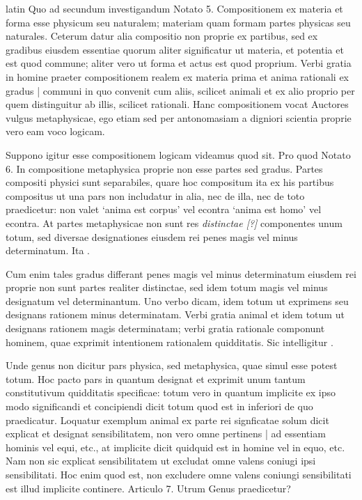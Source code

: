 \begin{otherlanguage*}{latin}
\pstart
 Quo ad secundum investigandum Notato 5. Compositionem ex materia et forma esse physicum seu naturalem; materiam quam formam partes physicas seu naturales. Ceterum datur alia compositio non proprie ex partibus, sed ex gradibus eiusdem essentiae quorum aliter significatur ut materia, et potentia et est quod commune; aliter vero ut forma et actus est quod proprium. Verbi gratia in homine praeter compositionem realem ex materia prima et anima rationali ex gradus \textnormal{|} communi in quo convenit cum aliis, scilicet animali et ex alio proprio per quem distinguitur ab illis, scilicet rationali. Hanc compositionem vocat Auctores vulgus metaphysicae, ego etiam sed per antonomasiam a digniori scientia proprie vero eam voco logicam. 
\pend

\pstart
 Suppono igitur esse compositionem logicam videamus quod sit. Pro quod Notato 6. In compositione metaphysica proprie non esse partes sed gradus. Partes compositi physici sunt separabiles, quare hoc compositum ita ex his partibus compositus ut una pars non includatur in alia, nec de illa, nec de toto praedicetur: non valet `anima est corpus' vel econtra `anima est homo' vel econtra. At partes metaphysicae non sunt  res \emph{distinctae [?]} componentes unum totum, sed diversae designationes eiusdem rei penes magis vel minus determinatum. Ita . 
\pend

\pstart
 Cum enim tales gradus differant penes magis vel minus determinatum eiusdem rei proprie non sunt partes realiter distinctae, sed idem totum magis vel minus designatum vel determinantum. Uno verbo dicam, idem totum ut exprimens seu designans rationem minus determinatam. Verbi gratia animal et idem totum ut designans rationem magis determinatam; verbi gratia rationale componunt hominem, quae exprimit intentionem rationalem quidditatis. Sic intelligitur  . 
\pend

\pstart
 Unde genus non dicitur pars physica, sed metaphysica, quae simul esse potest totum. Hoc pacto pars in quantum designat et exprimit unum tantum constitutivum quidditatis specificae: totum vero in quantum implicite ex ipso modo significandi et concipiendi dicit totum quod est in inferiori de quo praedicatur. Loquatur exemplum animal ex parte rei signficatae solum dicit explicat et designat sensibilitatem, non vero omne pertinens \textnormal{|}   ad essentiam hominis vel equi, etc., at implicite dicit quidquid est in homine vel in equo, etc. Nam non sic explicat sensibilitatem ut excludat omne valens coniugi ipsi sensibilitati. Hoc enim quod est, non excludere omne valens coniungi sensibilitati est illud implicite continere. Articulo 7. Utrum Genus praedicetur? 
\pend


\end{otherlanguage*}
